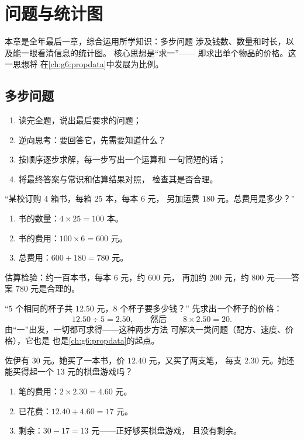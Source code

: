 \chapter{问题与统计图}\label{ch:g5:data}

本章是全年最后一章，综合运用所学知识：多步问题
涉及钱数、数量和时长，以及能一眼看清信息的统计图。
核心思想是“求一”——
即求出单个物品的价格。这一思想将
在\cref{ch:g6:propdata}中发展为比例。

\section{多步问题}

\begin{method}[解决长题目]\label{met:g5:data:steps}
\begin{enumerate}
  \item 读完全题，说出最后要求的问题；
  \item 逆向思考：要回答它，先需要知道什么？
  \item 按顺序逐步求解，每一步写出一个运算和
        一句简短的话；
  \item 将最终答案与常识和估算结果对照，
        检查其是否合理。
\end{enumerate}
\end{method}

\begin{example}\label{ex:g5:data:multistep}
“某校订购 $4$ 箱书，每箱 $25$ 本，每本 $6$ 元，
另加运费 $180$ 元。总费用是多少？”
\begin{enumerate}
  \item 书的数量：$4 \times 25 = 100$ 本。
  \item 书的费用：$100 \times 6 = 600$ 元。
  \item 总费用：$600 + 180 = 780$ 元。
\end{enumerate}
估算检验：约一百本书，每本 $6$ 元，约 $600$ 元，
再加约 $200$ 元，约 $800$ 元——答案 $780$ 元是合理的。
\end{example}

\begin{example}[求一]\label{ex:g5:data:perone}
“$5$ 个相同的杯子共 $12.50$ 元，$8$ 个杯子要多少钱？”
先求出\emph{一}个杯子的价格：
\[
12.50 \div 5 = 2.50,
\qquad\text{然后}\qquad
8 \times 2.50 = 20 .
\]
由“一”出发，一切都可求得——这种两步方法
可解决一类问题（配方、速度、价格），它也是
也是\cref{ch:g6:propdata}的起点。
\end{example}

\begin{example}[找零与预算]\label{ex:g5:data:budget}
佐伊有 $30$ 元。她买了一本书，价 $12.40$ 元，又买了两支笔，
每支 $2.30$ 元。她还能买得起一个 $13$ 元的棋盘游戏吗？
\begin{enumerate}
  \item 笔的费用：$2 \times 2.30 = 4.60$ 元。
  \item 已花费：$12.40 + 4.60 = 17$ 元。
  \item 剩余：$30 - 17 = 13$ 元——正好够买棋盘游戏，
        且没有剩余。
\end{enumerate}
\end{example}

